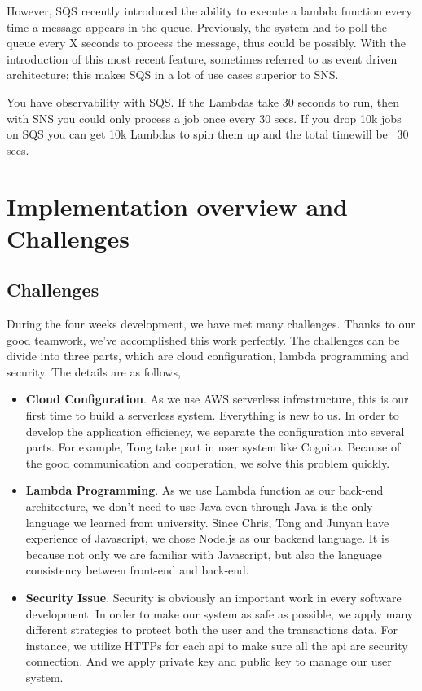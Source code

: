 \documentclass[runningheads]{llncs}
\begin{document}
However, SQS recently introduced the ability to execute a lambda function every time a message appears in the queue. Previously, the system had to poll the queue every X seconds to process the message, thus could be possibly. With the introduction of this most recent feature, sometimes referred to as event driven architecture; this makes SQS in a lot of use cases superior to SNS.

You have observability with SQS.  If the Lambdas take 30 seconds to run, then with SNS you could only process a job once every 30 secs.  If you drop 10k jobs on SQS you can get 10k Lambdas to spin them up and the total timewill be ~30 secs.
\section{Implementation overview and Challenges}

\subsection{Challenges}
During the four weeks development, we have met many challenges. Thanks to our good teamwork, we've accomplished this work perfectly. The challenges can be divide into three parts, which are cloud configuration, lambda programming and security. The details are as follows,
\begin{itemize}
	\item \textbf{Cloud Configuration}. As we use AWS serverless infrastructure, this is our first time to build a serverless system. Everything is new to us. In order to develop the application efficiency, we separate the configuration into several parts. For example, Tong take part in user system like Cognito. Because of the good communication and cooperation, we solve this problem quickly. 
	\item \textbf{Lambda Programming}. As we use Lambda function as our back-end architecture, we don't need to use Java even through Java is the only language we learned from university. Since Chris, Tong and Junyan have experience of Javascript, we chose Node.js as our backend language. It is because not only we are familiar with Javascript, but also the language consistency between front-end and back-end.
	\item \textbf{Security Issue}. Security is obviously an important work in every software development. In order to make our system as safe as possible, we apply many different strategies to protect both the user and the transactions data. For instance, we utilize HTTPs for each api to make sure all the api are security connection. And we apply private key and public key to manage our user system.
\end{itemize}
\end{document}

